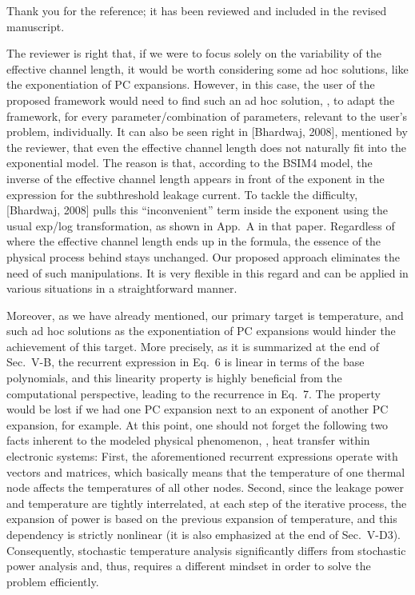 \begin{authors}
Thank you for the reference; it has been reviewed and included in the revised manuscript.

The reviewer is right that, if we were to focus solely on the variability of the effective channel length, it would be worth considering some ad hoc solutions, like the exponentiation of PC expansions.
However, in this case, the user of the proposed framework would need to find such an ad hoc solution, \ie, to adapt the framework, for every parameter/combination of parameters, relevant to the user's problem, individually.
It can also be seen right in [Bhardwaj, 2008], mentioned by the reviewer, that even the effective channel length does not naturally fit into the exponential model.
The reason is that, according to the BSIM4 model, the inverse of the effective channel length appears in front of the exponent in the expression for the subthreshold leakage current.
To tackle the difficulty, [Bhardwaj, 2008] pulls this ``inconvenient'' term inside the exponent using the usual exp/log transformation, as shown in App.~A in that paper.
Regardless of where the effective channel length ends up in the formula, the essence of the physical process behind stays unchanged.
Our proposed approach eliminates the need of such manipulations.
It is very flexible in this regard and can be applied in various situations in a straightforward manner.

Moreover, as we have already mentioned, our primary target is temperature, and such ad hoc solutions as the exponentiation of PC expansions would hinder the achievement of this target.
More precisely, as it is summarized at the end of Sec.~V-B, the recurrent expression in Eq.~6 is linear in terms of the base polynomials, and this linearity property is highly beneficial from the computational perspective, leading to the recurrence in Eq.~7.
The property would be lost if we had one PC expansion next to an exponent of another PC expansion, for example.
At this point, one should not forget the following two facts inherent to the modeled physical phenomenon, \ie, heat transfer within electronic systems: First, the aforementioned recurrent expressions operate with vectors and matrices, which basically means that the temperature of one thermal node affects the temperatures of all other nodes.
Second, since the leakage power and temperature are tightly interrelated, at each step of the iterative process, the expansion of power is based on the previous expansion of temperature, and this dependency is strictly nonlinear (it is also emphasized at the end of Sec.~V-D3).
Consequently, stochastic temperature analysis significantly differs from stochastic power analysis and, thus, requires a different mindset in order to solve the problem efficiently.


\end{authors}
